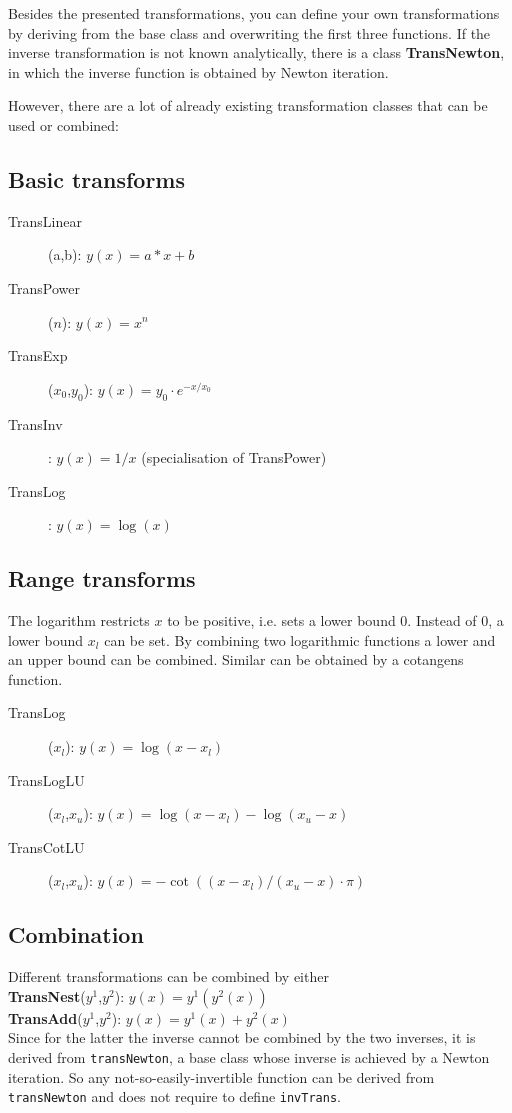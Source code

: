 Besides the presented transformations, you can define your own transformations by deriving from the base class and overwriting the first three functions.
If the inverse transformation is not known analytically, there is a class {\bf TransNewton}, in which the inverse function is obtained by Newton iteration.

However, there are a lot of already existing transformation classes that can be used or combined:

\subsection*{Basic transforms}
\begin{description}
\item[TransLinear](a,b): $y(x)=a*x+b$
\item[TransPower]($n$): $y(x)=x^n$
\item[TransExp]($x_0$,$y_0$): $y(x)=y_0\cdot e^{-x/x_0}$
\item[TransInv]: $y(x)=1/x$ (specialisation of TransPower)
\item[TransLog]: $y(x)=\log(x)$
\end{description}

\subsection*{Range transforms}
The logarithm restricts $x$ to be positive, i.e. sets a lower bound 0.
Instead of 0, a lower bound $x_l$ can be set.
By combining two logarithmic functions a lower and an upper bound can be combined.
Similar can be obtained by a cotangens function.

\begin{description}
\item[TransLog]($x_l$): $y(x)=\log(x-x_l)$
\item[TransLogLU]($x_l$,$x_u$): $y(x)=\log(x-x_l)-\log(x_u-x)$
\item[TransCotLU]($x_l$,$x_u$): $y(x)=-\cot((x-x_l)/(x_u-x)\cdot\pi)$
\end{description}

\subsection*{Combination}
Different transformations can be combined by either\\
{\bf TransNest}($y^1$,$y^2$): $y(x)=y^1(y^2(x))$\\
{\bf TransAdd}($y^1$,$y^2$): $y(x)=y^1(x)+y^2(x)$\\
Since for the latter the inverse cannot be combined by the two inverses, it is derived from \lstinline|transNewton|, a base class whose inverse is achieved by a Newton iteration.
So any not-so-easily-invertible function can be derived from \lstinline|transNewton| and does not require to define \lstinline|invTrans|.

